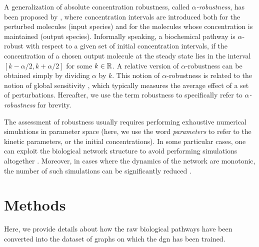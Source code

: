 A generalization of absolute concentration robustness, called \emph{$\alpha$-robustness}, has been proposed by \citet{nasti2018formalizing}, where concentration intervals are introduced both for the perturbed molecules (input species) and for the molecules whose concentration is maintained (output species). Informally speaking, a biochemical pathway is $\alpha$-robust with respect to a given set of initial concentration intervals, if the concentration of a chosen output molecule at the steady state lies in the interval $[k-\alpha/2,k+\alpha/2]$ for some $k \in \mathbb{R}$. A relative version of $\alpha$-robustness can be obtained simply by dividing $\alpha$ by $k$. This notion of $\alpha$-robustness is related to the notion of global sensitivity \citep{zi2011sensitivity}, which typically measures the average effect of a set of perturbations. Hereafter, we use the term robustness to specifically refer to \emph{$\alpha$-robustness} for brevity.

The assessment of robustness usually requires performing exhaustive numerical simulations in parameter space \citep{rizk2009general,iooss2015review} (here, we use the word \emph{parameters} to refer to the kinetic parameters, or the initial concentrations). In some particular cases, one can exploit the biological network structure to avoid performing simulations altogether \citep{shinar2010structural}. Moreover, in cases where the dynamics of the network are monotonic, the number of such simulations can be significantly reduced \citep{gori2019towards}.

\section{Methods}
Here, we provide details about how the raw biological pathways have been converted into the dataset of graphs on which the \gls{dgn} has been trained.

